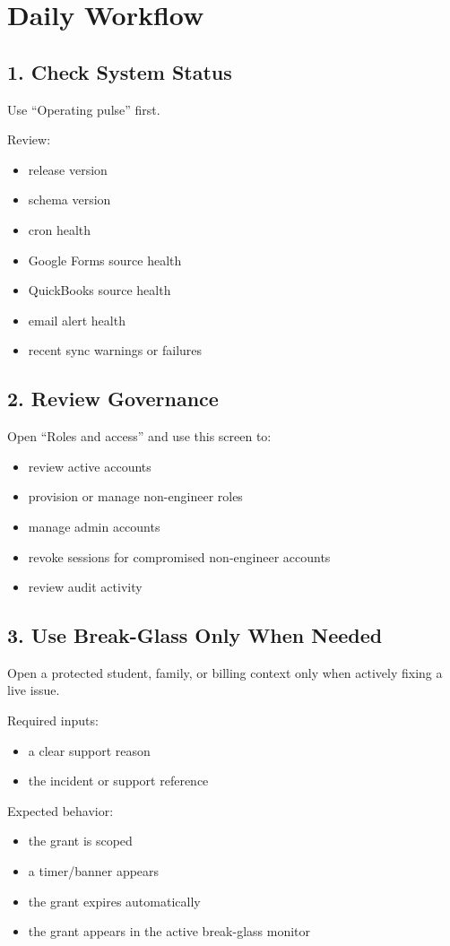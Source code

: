 \documentclass[11pt]{article}
\begin{document}
\section*{Daily Workflow}
\subsection*{1. Check System Status}
Use ``Operating pulse'' first.

Review:
\begin{itemize}
  \item release version
  \item schema version
  \item cron health
  \item Google Forms source health
  \item QuickBooks source health
  \item email alert health
  \item recent sync warnings or failures
\end{itemize}

\subsection*{2. Review Governance}
Open ``Roles and access'' and use this screen to:
\begin{itemize}
  \item review active accounts
  \item provision or manage non-engineer roles
  \item manage admin accounts
  \item revoke sessions for compromised non-engineer accounts
  \item review audit activity
\end{itemize}

\subsection*{3. Use Break-Glass Only When Needed}
Open a protected student, family, or billing context only when actively fixing a live issue.

Required inputs:
\begin{itemize}
  \item a clear support reason
  \item the incident or support reference
\end{itemize}

Expected behavior:
\begin{itemize}
  \item the grant is scoped
  \item a timer/banner appears
  \item the grant expires automatically
  \item the grant appears in the active break-glass monitor
\end{itemize}
\end{document}
